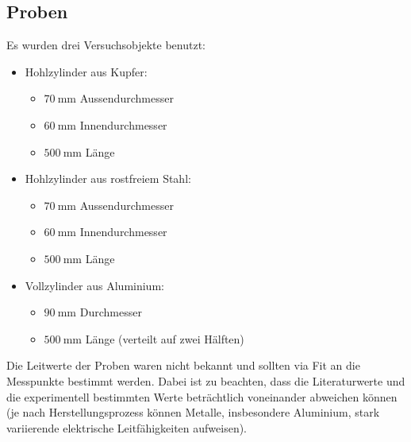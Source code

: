 \clearpage
\subsection{Proben}
\label{sec:durchf:subsec:proben}


Es wurden drei Versuchsobjekte benutzt:
\begin{itemize}
    \item
        Hohlzylinder aus Kupfer:
        \begin{itemize}
            \item
                $\SI{70}{\milli\meter}$ Aussendurchmesser
            \item
                $\SI{60}{\milli\meter}$ Innendurchmesser
            \item
                $\SI{500}{\milli\meter}$ L\"ange
        \end{itemize}
    \item
        Hohlzylinder aus rostfreiem Stahl:
        \begin{itemize}
            \item
                $\SI{70}{\milli\meter}$ Aussendurchmesser
            \item
                $\SI{60}{\milli\meter}$ Innendurchmesser
            \item
                $\SI{500}{\milli\meter}$ L\"ange
        \end{itemize}
    \item
        Vollzylinder aus Aluminium:
        \begin{itemize}
            \item
                $\SI{90}{\milli\meter}$ Durchmesser
            \item
                $\SI{500}{\milli\meter}$ L\"ange (verteilt auf zwei H\"alften)
        \end{itemize}
\end{itemize}


Die  Leitwerte der  Proben waren  nicht  bekannt und  sollten via  Fit an  die
Messpunkte  bestimmt werden. Dabei  ist zu  beachten, dass  die Literaturwerte
und die  experimentell bestimmten  Werte betr\"achtlich  voneinander abweichen
k\"onnen   (je  nach   Herstellungsprozess   k\"onnen  Metalle,   insbesondere
Aluminium, stark  variierende elektrische  Leitf\"ahigkeiten aufweisen).



